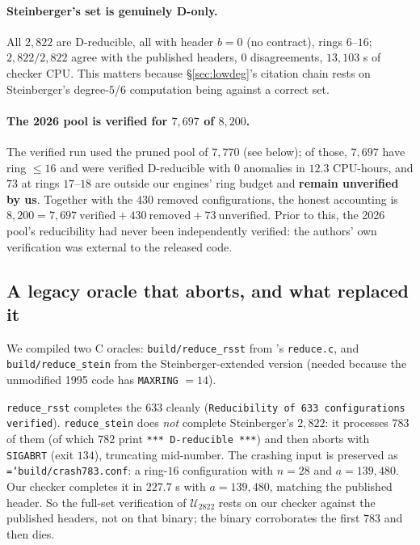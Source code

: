 \documentclass[11pt]{article}
\theoremstyle{definition}
\newcommand{\art}[1]{{\texttt{\hyphenchar\font=`\-\relax #1}}}
\begin{document}
\paragraph{Steinberger's set is genuinely D-only.} All $2{,}822$ are D-reducible,
all with header $b=0$ (no contract), rings $6$--$16$; $2{,}822/2{,}822$ agree with
the published headers, $0$ disagreements, $13{,}103$ s of checker CPU. This matters
because \S\ref{sec:lowdeg}'s citation chain rests on Steinberger's degree-$5$/$6$
computation being against a correct set.

\paragraph{The 2026 pool is verified for $7{,}697$ of $8{,}200$.} The verified run
used the pruned pool of $7{,}770$ (see below); of those, $7{,}697$ have ring $\le16$
and were verified D-reducible with $0$ anomalies in $12.3$ CPU-hours, and $73$ at
rings $17$--$18$ are outside our engines' ring budget and \textbf{remain unverified
by us}. Together with the $430$ removed configurations, the honest accounting is
$8{,}200 = 7{,}697\ \text{verified} + 430\ \text{removed} + 73\ \text{unverified}$.
Prior to this, the 2026 pool's reducibility had never been independently verified:
the authors' own verification was external to the released code.

\subsection{A legacy oracle that aborts, and what replaced it}

We compiled two C oracles: \texttt{build/reduce\_rsst} from \cite{rsst-reduce}'s
\texttt{reduce.c}, and \texttt{build/reduce\_stein} from the Steinberger-extended
version (needed because the unmodified 1995 code has \texttt{MAXRING} $=14$).

\texttt{reduce\_rsst} completes the $633$ cleanly
(\texttt{Reducibility of 633 configurations verified}). \texttt{reduce\_stein}
does \emph{not} complete Steinberger's $2{,}822$: it processes $783$ of them
(of which $782$ print \texttt{*** D-reducible ***}) and then aborts with
\texttt{SIGABRT} (exit $134$), truncating mid-number. The crashing input is
preserved as \art{build/crash783.conf}: a ring-$16$ configuration with
$n=28$ and $a=139{,}480$. Our checker completes it in $227.7$ s with
$a = 139{,}480$, matching the published header. So the full-set verification of
$\mathcal{U}_{2822}$ rests on our checker against the published headers, not on that
binary; the binary corroborates the first $783$ and then dies.
\end{document}
